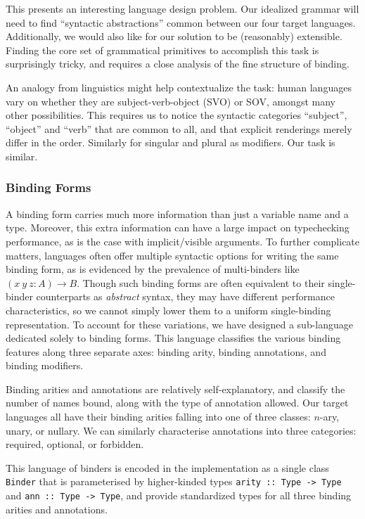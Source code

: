 \documentclass[a4paper,UKenglish,cleveref, autoref, thm-restate,anonymous]{lipics-v2021}
\begin{document}
This presents an interesting language design problem. Our idealized grammar will need
to find ``syntactic abstractions'' common between our four target languages.  Additionally,
we would also like for our solution to be (reasonably) extensible. Finding the core
set of grammatical primitives to accomplish this task is surprisingly tricky, and requires
a close analysis of the fine structure of binding.

An analogy from linguistics might help contextualize the task: human languages vary
on whether they are subject-verb-object (SVO) or SOV, amongst many other possibilities. This
requires us to notice the syntactic categories ``subject'', ``object'' and ``verb''
that are common to all, and that explicit renderings
merely differ in the order. Similarly for singular and plural as modifiers. Our task is
similar.

\subsubsection{Binding Forms}
\label{sec:binding-form}

A binding form carries
much more information than just a variable name and a type. Moreover, this
extra information can have a large impact on typechecking performance, as is
the case with implicit/visible arguments. To further complicate matters,
languages often offer multiple syntactic options for writing the same binding
form, as is evidenced by the prevalence of multi-binders like \((x\ y\ z : A)
\to B\). Though such binding forms are often equivalent to their single-binder
counterparts as \emph{abstract} syntax, they may have different performance
characteristics, so we cannot simply lower them to a uniform single-binding
representation. To account for these variations, we have designed a
sub-language dedicated solely to binding forms. This language classifies the
various binding features along three separate axes: binding arity, binding
annotations, and binding modifiers.

Binding arities and annotations are relatively self-explanatory, and classify
the number of names bound, along with the type of annotation allowed. Our
target languages all have their binding arities falling into one of three
classes: \(n\)-ary, unary, or nullary. We can similarly characterise
annotations into three categories: required, optional, or forbidden.

This language of binders is encoded in the implementation as a single class \lstinline|Binder| that is parameterised
by higher-kinded types \lstinline|arity :: Type -> Type| and \lstinline|ann :: Type -> Type|, and provide standardized
types for all three binding arities and annotations.  
\end{document}
